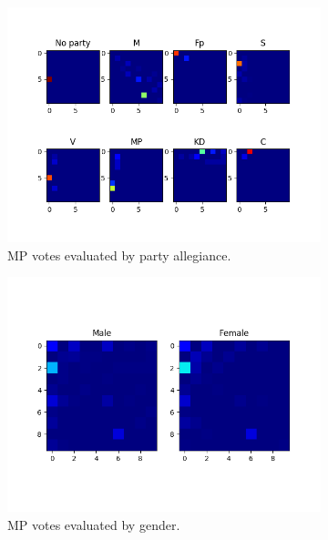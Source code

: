 \documentclass{article}
\begin{document}
\begin{figure}[ht!]
    \centering
    \begin{subfigure}[t]{0.4\textwidth}
        \centering
        \includegraphics[width=1\textwidth]{plots/assignment_2/party_votes_20_epochs.png}
        \caption{MP votes evaluated by party allegiance.}
    \end{subfigure}
    \begin{subfigure}[t]{0.4\textwidth}
        \centering
        \includegraphics[width=1\textwidth]{plots/assignment_2/sex_votes_20_epochs.png}
        \caption{MP votes evaluated by gender.}
    \end{subfigure}
    \begin{subfigure}[t]{\textwidth}

\end{subfigure}
\end{figure}
\end{document}
